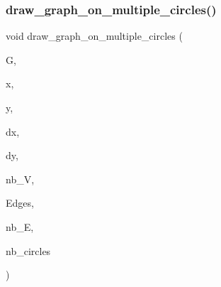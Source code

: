 \subsubsection{\texorpdfstring{draw\+\_\+graph\+\_\+on\+\_\+multiple\+\_\+circles()}{draw\_graph\_on\_multiple\_circles()}}
{\footnotesize\ttfamily void draw\+\_\+graph\+\_\+on\+\_\+multiple\+\_\+circles (\begin{DoxyParamCaption}\item[{\mbox{\hyperlink{classmp__graphics}{mp\+\_\+graphics}} $\ast$}]{G,  }\item[{\mbox{\hyperlink{galois_8h_a09fddde158a3a20bd2dcadb609de11dc}{I\+NT}}}]{x,  }\item[{\mbox{\hyperlink{galois_8h_a09fddde158a3a20bd2dcadb609de11dc}{I\+NT}}}]{y,  }\item[{\mbox{\hyperlink{galois_8h_a09fddde158a3a20bd2dcadb609de11dc}{I\+NT}}}]{dx,  }\item[{\mbox{\hyperlink{galois_8h_a09fddde158a3a20bd2dcadb609de11dc}{I\+NT}}}]{dy,  }\item[{\mbox{\hyperlink{galois_8h_a09fddde158a3a20bd2dcadb609de11dc}{I\+NT}}}]{nb\+\_\+V,  }\item[{\mbox{\hyperlink{galois_8h_a09fddde158a3a20bd2dcadb609de11dc}{I\+NT}} $\ast$}]{Edges,  }\item[{\mbox{\hyperlink{galois_8h_a09fddde158a3a20bd2dcadb609de11dc}{I\+NT}}}]{nb\+\_\+E,  }\item[{\mbox{\hyperlink{galois_8h_a09fddde158a3a20bd2dcadb609de11dc}{I\+NT}}}]{nb\+\_\+circles }\end{DoxyParamCaption})}

\mbox{\label{draw_8_c_a988569053fbe52d7320623c4e27b8aca}} 
